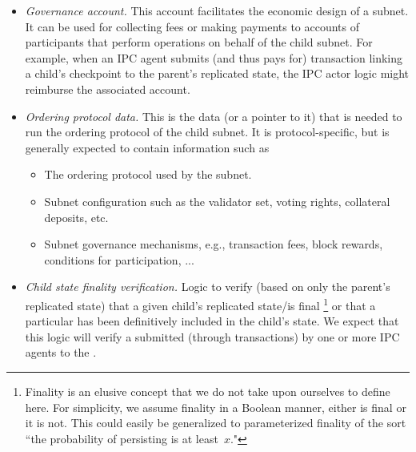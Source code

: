 \begin{itemize}
\begin{enumerate}
\begin{itemize}
            \item \emph{Governance account.}
            This account facilitates the economic design of a subnet.
            It can be used for collecting fees or making payments to accounts of participants that perform operations on behalf of the child subnet.
            For example, when an IPC agent submits (and thus pays for) transaction linking a child's checkpoint to the parent's replicated state,
            the IPC actor logic might reimburse the associated account.
            \item \emph{Ordering protocol data.}
            This is the data (or a pointer to it) that is needed to run the ordering protocol of the child subnet.
            It is protocol-specific, but is generally expected to contain information such as
            \begin{itemize}
                \item The ordering protocol used by the subnet.
                \item Subnet configuration such as the validator set, voting rights, collateral deposits, etc.
                \item Subnet governance mechanisms, e.g., transaction fees, block rewards, conditions for participation, ...
            \end{itemize}
            \item \emph{Child state finality verification.} Logic to verify (based on only the parent's replicated state)
            that a given child's replicated state/\tx is final%
\footnote{Finality is an elusive concept that we do not take upon ourselves to define here. For simplicity, we assume finality in a Boolean manner, either \tx is final or it is not. This could easily be generalized to parameterized finality of the sort ``the probability of \tx persisting is at least~$x$."}
            or that a particular \tx has been definitively included in the child's state.
            We expect that this logic will verify a \pof submitted (through transactions) by one or more IPC agents to the \sa.
          

\end{itemize}
\end{enumerate}
\end{itemize}
